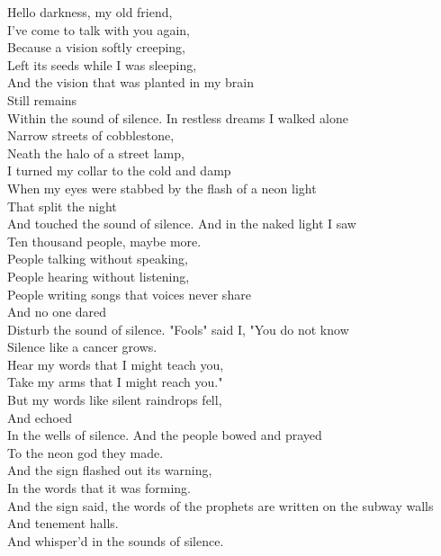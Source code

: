 
Hello darkness, my old friend,\\
I've come to talk with you again,\\
Because a vision softly creeping,\\
Left its seeds while I was sleeping,\\
And the vision that was planted in my brain\\
Still remains\\
Within the sound of silence.
\hops
In restless dreams I walked alone\\
Narrow streets of cobblestone,\\
Neath the halo of a street lamp,\\
I turned my collar to the cold and damp\\
When my eyes were stabbed by the flash of a neon light\\
That split the night\\
And touched the sound of silence.
\hops
And in the naked light I saw\\
Ten thousand people, maybe more.\\
People talking without speaking,\\
People hearing without listening,\\
People writing songs that voices never share\\
And no one dared\\
Disturb the sound of silence.
\hops
"Fools" said I, "You do not know\\
Silence like a cancer grows.\\
Hear my words that I might teach you,\\
Take my arms that I might reach you."\\
But my words like silent raindrops fell,\\
And echoed\\
In the wells of silence.
\hops
And the people bowed and prayed\\
To the neon god they made.\\
And the sign flashed out its warning,\\
In the words that it was forming.\\
And the sign said, the words of the prophets are written on the subway walls\\
And tenement halls.\\
And whisper'd in the sounds of silence. 
